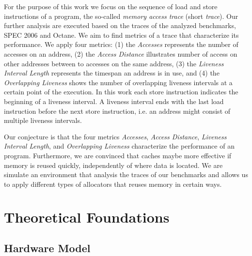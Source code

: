 \documentclass[onecolumn, openright, master, english, signatures]{dbrgrptt}
\begin{document}
For the purpose of this work we focus on the sequence of load and store instructions of a program, the so-called \emph{memory access trace} (short \emph{trace}). Our further analysis are executed based on the traces of the analyzed benchmarks, SPEC 2006 and Octane. We aim to find metrics of a trace that characterize its performance. We apply four metrics: (1) the \emph{Accesses} represents the number of accesses on an address, (2) the \emph{Access Distance} illustrates number of access on other addresses between to accesses on the same address, (3) the \emph{Liveness Interval Length} represents the timespan an address is in use, and (4) the \emph{Overlapping Liveness} shows the number of overlapping liveness intervals at a certain point of the execution. In this work each store instruction indicates the beginning of a liveness interval. A liveness interval ends with the last load instruction before the next store instruction, i.e. an address might consist of multiple liveness intervals.

Our conjecture is that the four metrics \emph{Accesses}, \emph{Access Distance}, \emph{Liveness Interval Length}, and \emph{Overlapping Liveness} characterize the performance of an program. Furthermore, we are convinced that caches maybe more effective if memory is reused quickly, independently of where data is located. We are simulate an environment that analysis the traces of our benchmarks and allows us to apply different types of allocators that reuses memory in certain ways.


\chapter{Theoretical Foundations}\label{cha:theoretical-foundations}


\section{Hardware Model}\label{sec:hardware-model}
\end{document}
